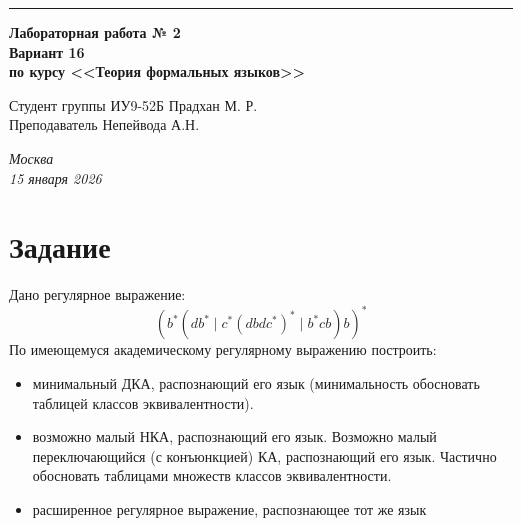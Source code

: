 \documentclass[a4paper, 14pt]{extarticle}
\begin{document}
\begin{titlepage}
\vspace*{-16pt}
\hspace{30pt}\rule{0.866\textwidth}{0.4pt}
  
\vspace{11em}

\begin{center}
\Large {\bf Лабораторная работа № 2} \\ 
\large {\bf Вариант 16} \\
\large {\bf по курсу <<Теория формальных языков>>} \\
\end{center}\normalsize

\vspace{8em}


\begin{flushright}
  {Студент группы ИУ9-52Б Прадхан М. Р. \hspace*{15pt}\\ 
  \vspace{2ex}
  Преподаватель Непейвода А.Н. \hspace*{15pt}}
\end{flushright}


\bigskip

\vfill
 

\begin{center}
\textsl{Москва} \\
\textsl{15 января 2026}
\end{center}
\end{titlepage}

\newpage

\section{Задание}
Дано регулярное выражение: \[(b^{*}(db^{*}\mid c^{*}(dbdc^{*})^{*}\mid b^{*}cb)b)^{*}\]
По имеющемуся академическому регулярному выражению построить:
\begin{itemize}
\item[---] минимальный ДКА, распознающий его язык (минимальность обосновать таблицей классов эквивалентности).
\item[---] возможно малый НКА, распознающий его язык. Возможно малый переключающийся (с конъюнкцией) КА, распознающий его язык. Частично обосновать таблицами множеств классов эквивалентности.
\item[---] расширенное регулярное выражение, распознающее тот же язык
\end{itemize}
\newpage
\end{document}
